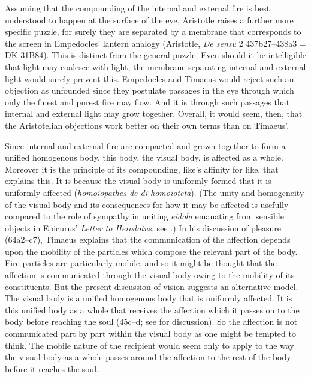 Assuming that the compounding of the internal and external fire is best understood to happen at the surface of the eye, Aristotle raises a further more specific puzzle, for surely they are separated by a membrane that corresponds to the screen in Empedocles' lantern analogy (Aristotle, \emph{De sensu} 2 437b27–438a3 = DK 31B84). This is distinct from the general puzzle. Even should it be intelligible that light may coalesce with light, the membrane separating internal and external light would surely prevent this. Empedocles and Timaeus would reject such an objection as unfounded since they postulate passages in the eye through which only the finest and purest fire may flow. And it is through such passages that internal and external light may grow together. Overall, it would seem, then, that the Aristotelian objections work better on their own terms than on Timaeus'.

Since internal and external fire are compacted and grown together to form a unified homogenous body, this body, the visual body, is affected as a whole. Moreover it is the principle of its compounding, like's affinity for like, that explains this. It is because the visual body is uniformly formed that it is uniformly affected (\emph{homoiopathes dē di homoiotēta}). (The unity and homogeneity of the visual body and its consequences for how it may be affected is usefully compared to the role of sympathy in uniting \emph{eidola} emanating from sensible objects in Epicurus' \emph{Letter to Herodotus}, see \citealt{Lee:1978yz}.) In his discussion of pleasure (64a2--c7), Timaeus explains that the communication of the affection depends upon the mobility of the particles which compose the relevant part of the body. Fire particles are particularly mobile, and so it might be thought that the affection is communicated through the visual body owing to the mobility of its constituents. But the present discussion of vision suggests an alternative model. The visual body is a unified homogenous body that is uniformly affected. It is this unified body as a whole that receives the affection which it passes on to the body before reaching the soul (45c--d; see \citealt[72, 92 n46]{Hahm:1978ny} for discussion). So the affection is not communicated part by part within the visual body as one might be tempted to think. The mobile nature of the recipient would seem only to apply to the way the visual body as a whole passes around the affection to the rest of the body before it reaches the soul.

